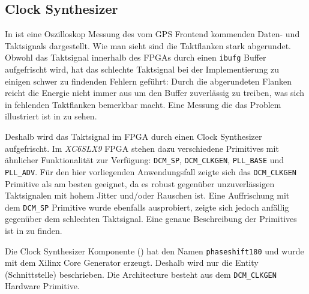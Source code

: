 \subsection{Clock Synthesizer}
In  ist eine Oszilloskop Messung des vom GPS Frontend kommenden Daten- und Taktsignals dargestellt. Wie man sieht sind die Taktflanken stark abgerundet. Obwohl das Taktsignal innerhalb des FPGAs durch einen \lstinline$ibufg$ Buffer aufgefrischt wird, hat das schlechte Taktsignal bei der Implementierung zu einigen schwer zu findenden Fehlern geführt: Durch die abgerundeten Flanken reicht die Energie nicht immer aus um den Buffer zuverlässig zu treiben, was sich in fehlenden Taktflanken bemerkbar macht. Eine Messung die das Problem illustriert ist in  zu sehen.

Deshalb wird das Taktsignal im FPGA durch einen Clock Synthesizer aufgefrischt. Im \emph{XC6SLX9} FPGA stehen dazu verschiedene \glspl{Primitive} mit ähnlicher Funktionalität zur Verfügung: \lstinline$DCM_SP$, \lstinline$DCM_CLKGEN$, \lstinline$PLL_BASE$ und \lstinline$PLL_ADV$. Für den hier vorliegenden Anwendungsfall zeigte sich das \lstinline$DCM_CLKGEN$ Primitive als am besten geeignet, da es robust gegenüber unzuverlässigen Taktsignalen mit hohem Jitter und/oder Rauschen ist. Eine Auffrischung mit dem \lstinline$DCM_SP$ Primitive wurde ebenfalls ausprobiert, zeigte sich jedoch anfällig gegenüber dem schlechten Taktsignal. Eine genaue Beschreibung der Primitives ist in \cite{SP6Clock} zu finden.



Die Clock Synthesizer Komponente () hat den Namen \lstinline$phaseshift180$ und wurde mit dem Xilinx Core Generator erzeugt. Deshalb wird nur die Entity (Schnittstelle) beschrieben. Die Architecture besteht aus dem \lstinline$DCM_CLKGEN$ Hardware \gls{Primitive}.


